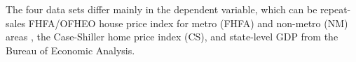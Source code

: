 \documentclass{amsart}\usepackage[]{graphicx}\usepackage[]{color}
\begin{document}
The four data sets differ mainly in the dependent variable, which can be repeat-sales FHFA/OFHEO house price index for metro (FHFA) and non-metro (NM) areas , the Case-Shiller home price index (CS), and state-level GDP from the Bureau of Economic Analysis. 

\newpage
\footnotesize

%

\end{document}
